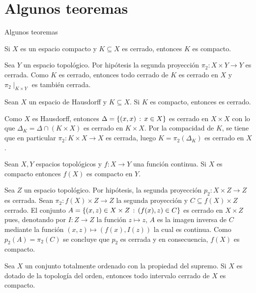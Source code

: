 \documentclass[10pt]{beamer}
\begin{document}
\section{Algunos teoremas}
\begin{frame}{Algunos teoremas}
  
    \begin{theorem}
  Si $X$ es un espacio compacto y $K\subseteq X$ es cerrado,
  entonces $K$ es compacto.
\end{theorem}
Sea $Y$ un espacio topológico. Por hipótesis la segunda proyección
  $\pi_2:X\times Y\longrightarrow Y$  es cerrada. Como $K$ es cerrado,
  entonces todo cerrado de $K$ es cerrado en $X$ y $\pi_2\mid_{K\times Y}$
  es también cerrada.
\end{frame}
\begin{frame}
  \begin{theorem}
  Sean $X$ un espacio de Hausdorff y $K\subseteq X$. Si $K$ es compacto,
  entonces es cerrado.
\end{theorem}
Como $X$ es Hausdorff, entonces $\Delta=\left\{(x,x)\,:\,x\in X\right\}$ es cerrado en $X\times X$
  con lo que $\Delta_K=\Delta\cap(K\times X)$ es cerrado en $K\times X$. Por la compacidad
  de $K$, se tiene que en particular $\pi_2:K\times X\longrightarrow X$ es cerrada, luego
  $K=\pi_2(\Delta_K)$ es cerrado en $X$.
\end{frame}
\begin{frame}
  \begin{theorem}
  Sean $X,Y$ espacios topológicos y $f:X\longrightarrow Y$ una función continua.
  Si $X$ es compacto entonces $f(X)$ es compacto en $Y$.
\end{theorem}


  Sea $Z$ un espacio topológico. Por hipótesis, la segunda proyección
  $p_2:X\times Z\longrightarrow Z$ es cerrada. Sean $\pi_2:f(X)\times Z\longrightarrow Z$
  la segunda proyección y $C\subseteq f(X)\times Z$ cerrado. El conjunto
  $A=\left\{(x,z)\in X\times Z\,:\,(f(x),z)\in C\right\}$ es cerrado en $X\times Z$ pues,
  denotando por $I:Z\longrightarrow Z$ la función $z\longmapsto z$,
  $A$ es la imagen inversa de $C$ mediante la función $(x,z)\longmapsto(f(x),I(z))$ la cual
  es continua. Como $p_2(A)=\pi_2(C)$ se concluye que $p_2$ es cerrada y en consecuencia,
  $f(X)$ es compacto.
\end{frame}
\begin{frame}
  \begin{theorem}
  Sea $X$ un conjunto totalmente ordenado con la propiedad del supremo. Si $X$
  es dotado de la topología del orden, entonces todo intervalo cerrado de $X$
  es compacto.
\end{theorem}

\end{frame}
\end{document}
